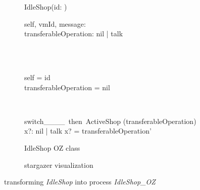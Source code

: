 \begin{figure}[H]
\begin{subfigure}{.6\textwidth}
\centering
\begin{class}{IdleShop(id: \integer)}
\\
\begin{state}
self, vmId, message: \integer
\\transferableOperation: nil | talk
\end{state} 
\\
\begin{init}
\\self = id
\\transferableOperation = nil
\end{init} 
\\
\begin{op}{switch\_\_\_\_\ then\ ActiveShop}
\Delta (transferableOperation)
\\x?: nil | talk
\ST
x? = transferableOperation'
\end{op}
\end{class}
  \caption{IdleShop OZ class}
\end{subfigure}%
\begin{subfigure}{.4\textwidth}
  \centering
{}
  \caption{stargazer visualization}
\end{subfigure}
\caption{transforming \textit{IdleShop} into \picalc{} process \textit{IdleShop\_OZ}}
\label{tra_idleShop_OZ}
\end{figure}

